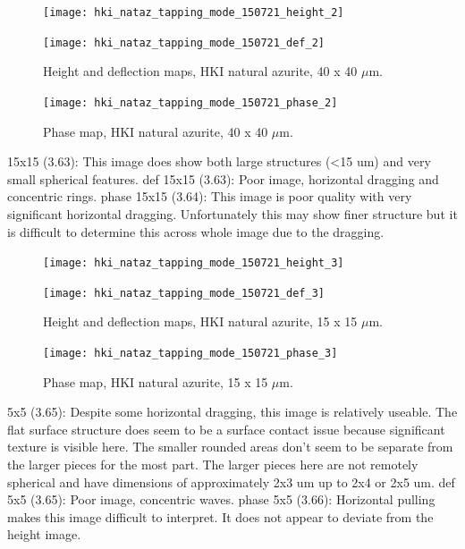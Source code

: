 \begin{figure}[H]
\centering
\begin{minipage}{.45\textwidth}
  \centering
  \texttt{[image: hki\_nataz\_tapping\_mode\_150721\_height\_2]}
\end{minipage}
\begin{minipage}{.45\textwidth}
  \centering
  \texttt{[image: hki\_nataz\_tapping\_mode\_150721\_def\_2]}
\end{minipage}
\caption[Height and deflection maps, HKI natural azurite]{Height and deflection maps, HKI natural azurite, 40 x 40 $\mu$m.}
\label{fig:afm_hki_nataz_height_def_2}
\end{figure}

\begin{figure}[H]
\centering
  \texttt{[image: hki\_nataz\_tapping\_mode\_150721\_phase\_2]}
\caption[Phase map, HKI natural azurite]{Phase map, HKI natural azurite, 40 x 40 $\mu$m.}
\label{fig:afm_hki_nataz_phase_2}
\end{figure}

15x15 (3.63): This image does show both large structures (<15 um) and very small spherical features.
def 15x15 (3.63): Poor image, horizontal dragging and concentric rings.
phase 15x15 (3.64): This image is poor quality with very significant horizontal dragging. Unfortunately this may show finer structure but it is difficult to determine this across whole image due to the dragging. 


\begin{figure}[H]
\centering
\begin{minipage}{.45\textwidth}
  \centering
  \texttt{[image: hki\_nataz\_tapping\_mode\_150721\_height\_3]}
\end{minipage}
\begin{minipage}{.45\textwidth}
  \centering
  \texttt{[image: hki\_nataz\_tapping\_mode\_150721\_def\_3]}
\end{minipage}
\caption[Height and deflection maps, HKI natural azurite]{Height and deflection maps, HKI natural azurite, 15 x 15 $\mu$m.}
\label{fig:afm_hki_nataz_height_def_3}
\end{figure}

\begin{figure}[H]
\centering
  \texttt{[image: hki\_nataz\_tapping\_mode\_150721\_phase\_3]}
\caption[Phase map, HKI natural azurite]{Phase map, HKI natural azurite, 15 x 15 $\mu$m.}
\label{fig:afm_hki_nataz_phase_3}
\end{figure}

5x5 (3.65):  Despite some horizontal dragging, this image is relatively useable. The flat surface structure does seem to be a surface contact issue because significant texture is visible here. The smaller rounded areas don’t seem to be separate from the larger pieces for the most part. The larger pieces here are not remotely spherical and have dimensions of approximately 2x3 um up to 2x4 or 2x5 um.
def 5x5 (3.65): Poor image, concentric waves.
phase 5x5 (3.66): Horizontal pulling makes this image difficult to interpret. It does not appear to deviate from the height image. 

